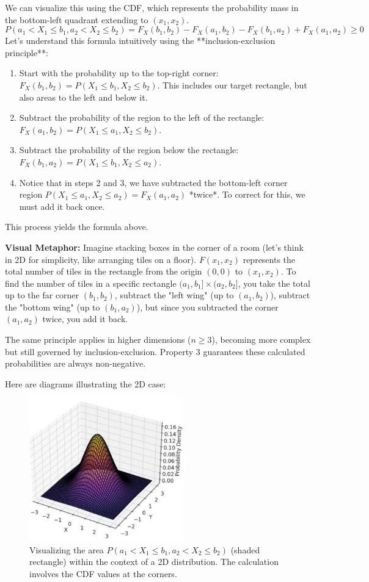 \documentclass[11pt, a4paper]{article}
\theoremstyle{definition} %
\begin{document}
We can visualize this using the CDF, which represents the probability mass in the bottom-left quadrant extending to $(x_1, x_2)$.
\[ P(a_1 < X_1 \le b_1, a_2 < X_2 \le b_2) = F_X(b_1, b_2) - F_X(a_1, b_2) - F_X(b_1, a_2) + F_X(a_1, a_2) \ge 0 \]
Let's understand this formula intuitively using the **inclusion-exclusion principle**:
\begin{enumerate}
    \item Start with the probability up to the top-right corner: $F_X(b_1, b_2) = P(X_1 \le b_1, X_2 \le b_2)$. This includes our target rectangle, but also areas to the left and below it.
    \item Subtract the probability of the region to the left of the rectangle: $F_X(a_1, b_2) = P(X_1 \le a_1, X_2 \le b_2)$.
    \item Subtract the probability of the region below the rectangle: $F_X(b_1, a_2) = P(X_1 \le b_1, X_2 \le a_2)$.
    \item Notice that in steps 2 and 3, we have subtracted the bottom-left corner region $P(X_1 \le a_1, X_2 \le a_2) = F_X(a_1, a_2)$ *twice*. To correct for this, we must add it back once.
\end{enumerate}
This process yields the formula above.

\textbf{Visual Metaphor:} Imagine stacking boxes in the corner of a room (let's think in 2D for simplicity, like arranging tiles on a floor). $F(x_1, x_2)$ represents the total number of tiles in the rectangle from the origin $(0,0)$ to $(x_1, x_2)$. To find the number of tiles in a specific rectangle $(a_1, b_1] \times (a_2, b_2]$, you take the total up to the far corner $(b_1, b_2)$, subtract the "left wing" (up to $(a_1, b_2)$), subtract the "bottom wing" (up to $(b_1, a_2)$), but since you subtracted the corner $(a_1, a_2)$ twice, you add it back.

The same principle applies in higher dimensions ($n \ge 3$), becoming more complex but still governed by inclusion-exclusion. Property 3 guarantees these calculated probabilities are always non-negative.

Here are diagrams illustrating the 2D case:

\begin{figure}[htbp]
    \centering
    \includegraphics[width=0.6\textwidth]{img-0.jpeg.jpeg}
    \caption{Visualizing the area $P(a_1 < X_1 \le b_1, a_2 < X_2 \le b_2)$ (shaded rectangle) within the context of a 2D distribution. The calculation involves the CDF values at the corners.}
    \label{fig:2d_rect}
\end{figure}
\end{document}
